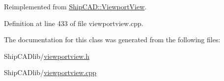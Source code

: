 Reimplemented from \hyperlink{classShipCAD_1_1ViewportView_a2dc46f8d032d707308cf853c70bc965a}{Ship\-C\-A\-D\-::\-Viewport\-View}.



Definition at line 433 of file viewportview.\-cpp.



The documentation for this class was generated from the following files\-:\begin{DoxyCompactItemize}
\item 
Ship\-C\-A\-Dlib/\hyperlink{viewportview_8h}{viewportview.\-h}\item 
Ship\-C\-A\-Dlib/\hyperlink{viewportview_8cpp}{viewportview.\-cpp}\end{DoxyCompactItemize}
